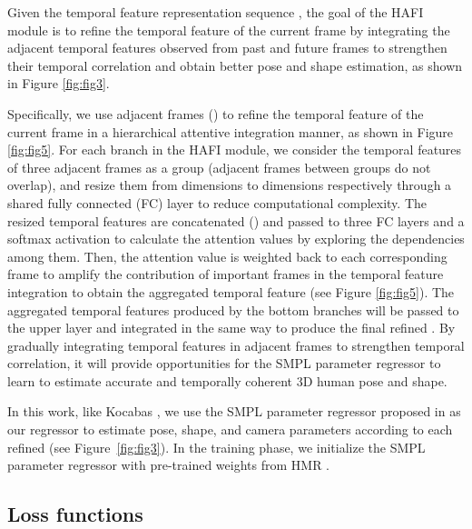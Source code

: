 \documentclass[10pt,twocolumn,letterpaper]{article}
\begin{document}
Given the temporal feature representation sequence , the goal of the HAFI module is to refine the temporal feature of the current frame  by integrating the adjacent temporal features observed from past and future frames to strengthen their temporal correlation and obtain better pose and shape estimation, as shown in Figure \ref{fig:fig3}.

Specifically, we use  adjacent frames (\ie ) to refine the temporal feature of the current frame  in a hierarchical attentive integration manner, as shown in Figure \ref{fig:fig5}.
For each branch in the HAFI module, we consider the temporal features of three adjacent frames as a group (adjacent frames between groups do not overlap), and resize them from  dimensions to  dimensions respectively through a shared fully connected (FC) layer to reduce computational complexity. The resized temporal features are concatenated () and passed to three FC layers and a softmax activation to calculate the attention values  by exploring the dependencies among them. Then, the attention value is weighted back to each corresponding frame to amplify the contribution of important frames in the temporal feature integration to obtain the aggregated temporal feature (see Figure \ref{fig:fig5}). The aggregated temporal features produced by the bottom branches will be passed to the upper layer and integrated in the same way to produce the final refined . By gradually integrating temporal features in adjacent frames to strengthen temporal correlation, it will provide opportunities for the SMPL parameter regressor to learn to estimate accurate and temporally coherent 3D human pose and shape.

In this work, like Kocabas \etal \cite{Kocabas2020VIBEVI}, we use the SMPL parameter regressor proposed in \cite{hmrKanazawa17, Kolotouros2019LearningTR} as our regressor to estimate pose, shape, and camera parameters  according to each refined  (see Figure~\ref{fig:fig3}). In the training phase, we initialize the SMPL parameter regressor with pre-trained weights from HMR \cite{hmrKanazawa17, Kolotouros2019LearningTR}.\vspace{-3pt}


\subsection{Loss functions}\vspace{-4pt}
\end{document}
